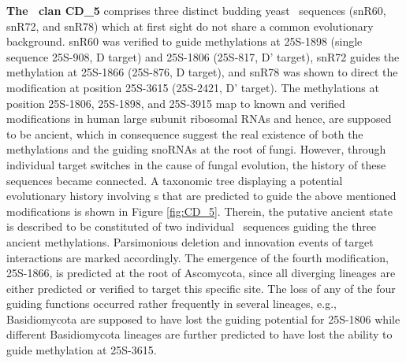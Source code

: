 \textbf{The \sno\ clan CD\_5} comprises three distinct budding yeast \sno\
sequences (snR60, snR72, and snR78) which at first sight do not share
a common evolutionary background. snR60 was verified to guide
methylations at 25S-1898 (single sequence 25S-908, D target) and
25S-1806 (25S-817, D' target), snR72 guides the methylation at
25S-1866 (25S-876, D target), and snR78 was shown to direct the
modification at position 25S-3615 (25S-2421, D' target). The
methylations at position 25S-1806, 25S-1898, and 25S-3915 map to known
and verified modifications in human large subunit ribosomal RNAs and
hence, are supposed to be ancient, which in consequence suggest the real existence
of both the methylations and the guiding snoRNAs at the root of fungi.
However, through individual target switches in the cause of fungal
evolution, the history of these sequences became connected. A
taxonomic tree displaying a potential evolutionary history involving
\sno s that are predicted to guide the above mentioned modifications is shown in
Figure \ref{fig:CD_5}. Therein, the putative ancient state is
described to be constituted of two individual \sno\
sequences guiding the three ancient methylations. 
Parsimonious deletion and innovation events of target interactions are marked
accordingly. The emergence of the fourth modification, 25S-1866, is
predicted at the root of Ascomycota, since all diverging
lineages are either predicted or verified to target this specific
site. The loss of any of the four guiding functions occurred rather
frequently in several lineages, e.g., Basidiomycota are supposed to
have lost the guiding potential for 25S-1806 while different
Basidiomycota lineages are further predicted to have lost the ability
to guide methylation at 25S-3615.

